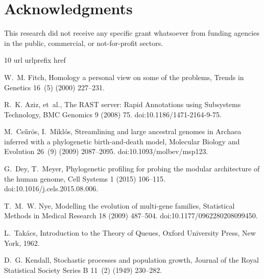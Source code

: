 \documentclass{elsarticle}
\begin{document}
\section*{Acknowledgments}
This research did not receive any specific grant whatsoever from funding agencies in the public, commercial, or not-for-profit sectors.

%     

\begin{thebibliography}{10}
\expandafter\ifx\csname url\endcsname\relax
  \def\url#1{\texttt{#1}}\fi
\expandafter\ifx\csname urlprefix\endcsname\relax\def\urlprefix{URL }\fi
\expandafter\ifx\csname href\endcsname\relax
  \def\href#1#2{#2} \def\path#1{#1}\fi

W.~M. Fitch, Homology a personal view on some of the problems, Trends in
  Genetics 16~(5) (2000) 227--231.

R.~K. Aziz, et~al., The {RAST} server: {R}apid {A}nnotations using {S}ubsystems
  {T}echnology, BMC Genomics 9 (2008) 75.
\newblock \href {https://doi.org/10.1186/1471-2164-9-75}
  {\path{doi:10.1186/1471-2164-9-75}}.

M.~Cs\H{u}r\"os, I.~Mikl\'os, Streamlining and large ancestral genomes in
  {A}rchaea inferred with a phylogenetic birth-and-death model, Molecular
  Biology and Evolution 26~(9) (2009) 2087--2095.
\newblock \href {https://doi.org/10.1093/molbev/msp123}
  {\path{doi:10.1093/molbev/msp123}}.

G.~Dey, T.~Meyer, Phylogenetic profiling for probing the modular architecture
  of the human genome, Cell Systems 1 (2015) 106--115.
\newblock \href {https://doi.org/10.1016/j.cels.2015.08.006}
  {\path{doi:10.1016/j.cels.2015.08.006}}.

T.~M.~W. Nye, Modelling the evolution of multi-gene families, Statistical
  Methods in Medical Research 18 (2009) 487--504.
\newblock \href {https://doi.org/10.1177/0962280208099450}
  {\path{doi:10.1177/0962280208099450}}.

L.~Tak\'acs, Introduction to the Theory of Queues, Oxford University Press, New
  York, 1962.

D.~G. Kendall, Stochastic processes and population growth, Journal of the Royal
  Statistical Society Series B 11~(2) (1949) 230--282.


\end{thebibliography}
\end{document}
